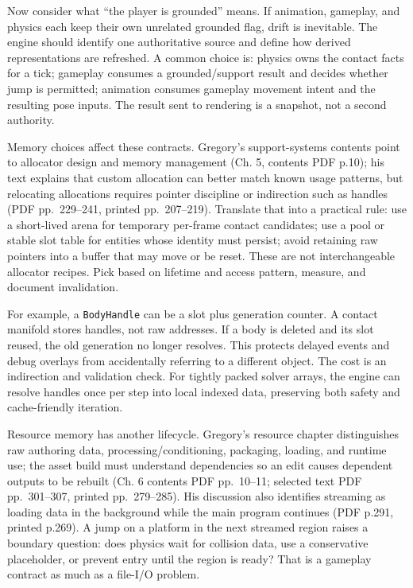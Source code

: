 Now consider what ``the player is grounded'' means. If animation, gameplay, and physics each keep their own unrelated grounded flag, drift is inevitable. The engine should identify one authoritative source and define how derived representations are refreshed. A common choice is: physics owns the contact facts for a tick; gameplay consumes a grounded/support result and decides whether jump is permitted; animation consumes gameplay movement intent and the resulting pose inputs. The result sent to rendering is a snapshot, not a second authority.

Memory choices affect these contracts. Gregory's support-systems contents point to allocator design and memory management (Ch. 5, contents PDF p.10); his text explains that custom allocation can better match known usage patterns, but relocating allocations requires pointer discipline or indirection such as handles (PDF pp.~229--241, printed pp.~207--219). Translate that into a practical rule: use a short-lived arena for temporary per-frame contact candidates; use a pool or stable slot table for entities whose identity must persist; avoid retaining raw pointers into a buffer that may move or be reset. These are not interchangeable allocator recipes. Pick based on lifetime and access pattern, measure, and document invalidation.

For example, a \texttt{BodyHandle} can be a slot plus generation counter. A contact manifold stores handles, not raw addresses. If a body is deleted and its slot reused, the old generation no longer resolves. This protects delayed events and debug overlays from accidentally referring to a different object. The cost is an indirection and validation check. For tightly packed solver arrays, the engine can resolve handles once per step into local indexed data, preserving both safety and cache-friendly iteration.

Resource memory has another lifecycle. Gregory's resource chapter distinguishes raw authoring data, processing/conditioning, packaging, loading, and runtime use; the asset build must understand dependencies so an edit causes dependent outputs to be rebuilt (Ch. 6 contents PDF pp.~10--11; selected text PDF pp.~301--307, printed pp.~279--285). His discussion also identifies streaming as loading data in the background while the main program continues (PDF p.291, printed p.269). A jump on a platform in the next streamed region raises a boundary question: does physics wait for collision data, use a conservative placeholder, or prevent entry until the region is ready? That is a gameplay contract as much as a file-I/O problem.

